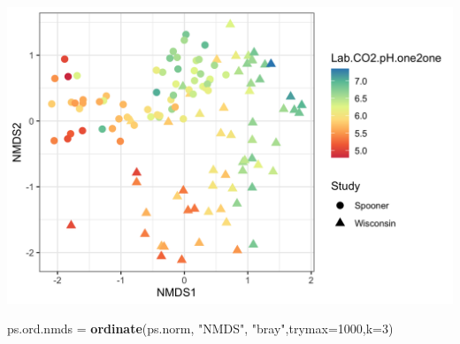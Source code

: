 \documentclass[]{article}
\newenvironment{Shaded}{\begin{snugshade}}{\end{snugshade}}
\newcommand{\DataTypeTok}[1]{\textcolor[rgb]{0.13,0.29,0.53}{#1}}
\newcommand{\DecValTok}[1]{\textcolor[rgb]{0.00,0.00,0.81}{#1}}
\newcommand{\KeywordTok}[1]{\textcolor[rgb]{0.13,0.29,0.53}{\textbf{#1}}}
\newcommand{\NormalTok}[1]{#1}
\newcommand{\StringTok}[1]{\textcolor[rgb]{0.31,0.60,0.02}{#1}}
\begin{document}
\includegraphics{output-rmd/nmds-bray-soilph-Lab.CO2.pH.one2one-both-studies-1.png}

\begin{Shaded}
\begin{Highlighting}[]
\NormalTok{ps.ord.nmds =}\StringTok{ }\KeywordTok{ordinate}\NormalTok{(ps.norm, }\StringTok{"NMDS"}\NormalTok{, }\StringTok{"bray"}\NormalTok{,}\DataTypeTok{trymax=}\DecValTok{1000}\NormalTok{,}\DataTypeTok{k=}\DecValTok{3}\NormalTok{)}
\end{Highlighting}
\end{Shaded}
\end{document}
